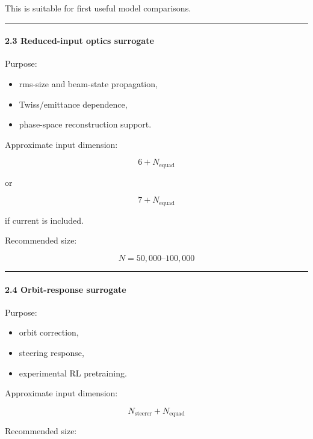 \documentclass[
]{article}
\providecommand{\tightlist}{%
  \setlength{\itemsep}{0pt}\setlength{\parskip}{0pt}}
\begin{document}
This is suitable for first useful model comparisons.

\begin{center}\rule{0.5\linewidth}{0.5pt}\end{center}

\hypertarget{reduced-input-optics-surrogate}{%
\paragraph{2.3 Reduced-input optics
surrogate}\label{reduced-input-optics-surrogate}}

Purpose:

\begin{itemize}
\tightlist
\item
  rms-size and beam-state propagation,
\item
  Twiss/emittance dependence,
\item
  phase-space reconstruction support.
\end{itemize}

Approximate input dimension:

\[
6 + N_{\mathrm{equad}}
\]

or

\[
7 + N_{\mathrm{equad}}
\]

if current is included.

Recommended size:

\[
N = 50{,}000\text{--}100{,}000
\]

\begin{center}\rule{0.5\linewidth}{0.5pt}\end{center}

\hypertarget{orbit-response-surrogate}{%
\paragraph{2.4 Orbit-response
surrogate}\label{orbit-response-surrogate}}

Purpose:

\begin{itemize}
\tightlist
\item
  orbit correction,
\item
  steering response,
\item
  experimental RL pretraining.
\end{itemize}

Approximate input dimension:

\[
N_{\mathrm{steerer}} + N_{\mathrm{equad}}
\]

Recommended size:
\end{document}
